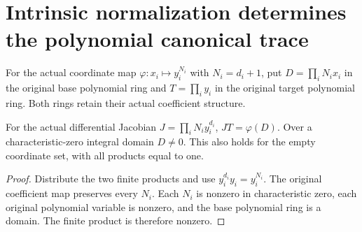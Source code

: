 \section{Intrinsic normalization determines the polynomial canonical trace}

\begin{definition}\label{def:kn-nadel-trace-branch-polynomial}
\leanok
For the actual coordinate map $\varphi:x_i\mapsto y_i^{N_i}$ with
$N_i=d_i+1$, put $D=\prod_iN_ix_i$ in the original base polynomial ring
and $T=\prod_i y_i$ in the original target polynomial ring.  Both rings
retain their actual coefficient structure.
\end{definition}

\begin{lemma}\label{lem:kn-nadel-trace-jacobian-denominator}
\leanok
{}
For the actual differential Jacobian $J=\prod_iN_iy_i^{d_i}$,
$JT=\varphi(D)$.  Over a characteristic-zero integral domain $D\ne0$.
This also holds for the empty coordinate set, with all products equal to one.
\end{lemma}
\begin{proof}
Distribute the two finite products and use
$y_i^{d_i}y_i=y_i^{N_i}$.  The original coefficient map preserves
every $N_i$.  Each $N_i$ is nonzero in characteristic zero, each original
polynomial variable is nonzero, and the base polynomial ring is a domain.
The finite product is therefore nonzero.
\end{proof}

